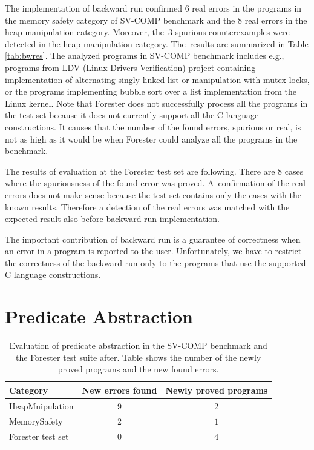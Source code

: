 The implementation of backward run confirmed $6$ real errors in the programs
in the memory safety category of SV-COMP benchmark and
the $8$ real errors in the heap manipulation category.
Moreover, the~$3$ spurious counterexamples were detected in the heap manipulation category.
The~results are summarized in Table \ref{tab:bwres}.
The analyzed programs in SV-COMP benchmark includes 
e.g., programs from LDV (Linux Drivers Verification) project
containing implementation of alternating singly-linked list
or manipulation with mutex locks, or the programs
implementing bubble sort over a list implementation from the Linux kernel.
Note that Forester does not successfully process all the programs in the test set
because it does not currently support all the C language constructions.
It causes that the number of the found errors, spurious or real, is not as high as it would be when
Forester could analyze all the programs in the benchmark.

The results of evaluation at the Forester test set are following.
There are $8$ cases where the spuriousness of the found error was proved.
A~confirmation of the real errors does not make sense because
the test set contains only the cases with the known results.
Therefore a detection of the real errors was
matched with the expected result also
before backward run implementation.

The important contribution of backward run is a guarantee of correctness when
an error in a program is reported to the user.
Unfortunately, we have to restrict the correctness of the backward run
only to the programs that use the supported C language constructions.

\section{Predicate Abstraction}
\label{sec:paeval}

\begin{table}[bt]
	\vskip6pt
	\caption{Evaluation of predicate abstraction
	in the SV-COMP benchmark and the Forester test suite after.
	Table shows the number of the newly proved programs and the new found
	errors.}
	\centering
	\begin{tabular}{| l | c | c |}
		\hline
		Category & New errors found & Newly proved programs  \\
		\hline
		\hline
		HeapMnipulation & $9$ & $2$ \\
		\hline
		MemorySafety & $2$ & $1$ \\
		\hline
		Forester test set & $0$ & $4$  \\
		\hline
	\end{tabular}
	\label{tab:pares}
\end{table}

